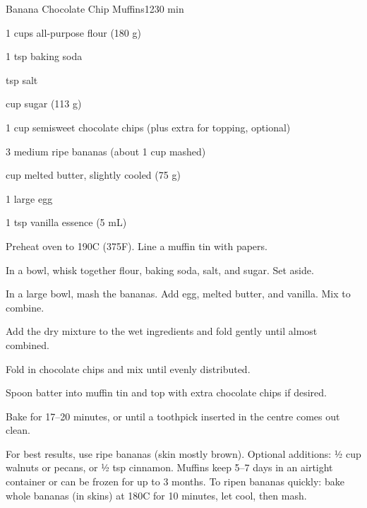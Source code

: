 \begin{recipebox}{Banana Chocolate Chip Muffins}{12}{30 min}
\begin{ingredients}
  \item 1  cups all-purpose flour (180 g)
  \item 1 tsp baking soda
  \item {} tsp salt
  \item {} cup sugar (113 g)
  \item 1 cup semisweet chocolate chips (plus extra for topping, optional)
  \item 3 medium ripe bananas (about 1 cup mashed)
  \item {} cup melted butter, slightly cooled (75 g)
  \item 1 large egg
  \item 1 tsp vanilla essence (5 mL)
\end{ingredients}

\begin{method}
  \item Preheat oven to 190\degree C (375\degree F). Line a muffin tin with papers.  
  \item In a bowl, whisk together flour, baking soda, salt, and sugar. Set aside.  
  \item In a large bowl, mash the bananas. Add egg, melted butter, and vanilla. Mix to combine.  
  \item Add the dry mixture to the wet ingredients and fold gently until almost combined.  
  \item Fold in chocolate chips and mix until evenly distributed.  
  \item Spoon batter into muffin tin and top with extra chocolate chips if desired.  
  \item Bake for 17–20 minutes, or until a toothpick inserted in the centre comes out clean.  
\end{method}

\begin{notes}
For best results, use ripe bananas (skin mostly brown).  
Optional additions: ½ cup walnuts or pecans, or ½ tsp cinnamon.  
Muffins keep 5–7 days in an airtight container or can be frozen for up to 3 months.  
To ripen bananas quickly: bake whole bananas (in skins) at 180\degree C for 10 minutes, let cool, then mash.  
\end{notes}
\end{recipebox}



